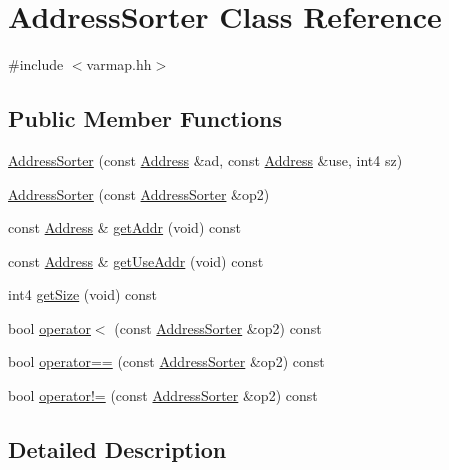 \hypertarget{class_address_sorter}{}\section{Address\+Sorter Class Reference}
\label{class_address_sorter}


{\ttfamily \#include $<$varmap.\+hh$>$}

\subsection*{Public Member Functions}
\begin{DoxyCompactItemize}
\item 
\mbox{\hyperlink{class_address_sorter_adf305458ec94fcb21a7a6506ecfd4582}{Address\+Sorter}} (const \mbox{\hyperlink{class_address}{Address}} \&ad, const \mbox{\hyperlink{class_address}{Address}} \&use, int4 sz)
\item 
\mbox{\hyperlink{class_address_sorter_a9b2a674adba86aaaf53a2c4220b0006c}{Address\+Sorter}} (const \mbox{\hyperlink{class_address_sorter}{Address\+Sorter}} \&op2)
\item 
const \mbox{\hyperlink{class_address}{Address}} \& \mbox{\hyperlink{class_address_sorter_aead65776190c5c566f80727b2dfa144f}{get\+Addr}} (void) const
\item 
const \mbox{\hyperlink{class_address}{Address}} \& \mbox{\hyperlink{class_address_sorter_a9d10f94b4b86407b2e269be85c36a7ea}{get\+Use\+Addr}} (void) const
\item 
int4 \mbox{\hyperlink{class_address_sorter_a8637f098fe6b89ba4750bb6f70b57f9a}{get\+Size}} (void) const
\item 
bool \mbox{\hyperlink{class_address_sorter_a39619f7c017c835970a787456f25ea8b}{operator$<$}} (const \mbox{\hyperlink{class_address_sorter}{Address\+Sorter}} \&op2) const
\item 
bool \mbox{\hyperlink{class_address_sorter_aefa864376ccabda90c574d52f7d023d9}{operator==}} (const \mbox{\hyperlink{class_address_sorter}{Address\+Sorter}} \&op2) const
\item 
bool \mbox{\hyperlink{class_address_sorter_a6e2a2206ab7fa9963d0320be1894abe5}{operator!=}} (const \mbox{\hyperlink{class_address_sorter}{Address\+Sorter}} \&op2) const
\end{DoxyCompactItemize}


\subsection{Detailed Description}


